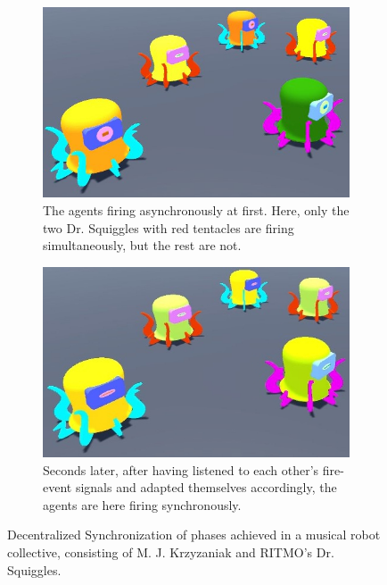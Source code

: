 	\begin{figure}[h]
		\centering
			\begin{subfigure}[t]{.5\textwidth}
				\centering\captionsetup{width=.9\linewidth}%
				\includegraphics[width=0.9\linewidth]{Assets/Figures/IntroUnsynch.jpg}
				\caption{The agents firing asynchronously at first. Here, only the two Dr. Squiggles with red tentacles are firing simultaneously, but the rest are not.}
				\label{fig:initial:unsynch}
			\end{subfigure}%
			\begin{subfigure}[t]{.5\textwidth}
				\centering\captionsetup{width=.9\linewidth}%
				\includegraphics[width=0.9\linewidth]{Assets/Figures/IntroSynch.jpg}
				\caption{Seconds later, after having listened to each other's fire-event signals and adapted themselves accordingly, the agents are here firing synchronously.}
				\label{fig:initial:synch}
			\end{subfigure}
		\caption{Decentralized Synchronization of phases achieved in a musical robot collective, consisting of M. J. Krzyzaniak and RITMO's Dr. Squiggles. }	%
		\label{fig:initial}
	\end{figure}

